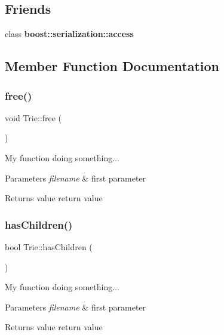 \subsection*{Friends}
\begin{DoxyCompactItemize}
\item 
\mbox{\label{classTrie_ac98d07dd8f7b70e16ccb9a01abf56b9c}} 
class {\bfseries boost\+::serialization\+::access}
\end{DoxyCompactItemize}


\subsection{Member Function Documentation}
\mbox{\label{classTrie_acc37b98a99d3262cf5d211070bca71d9}} 
\subsubsection{\texorpdfstring{free()}{free()}}
{\footnotesize\ttfamily void Trie\+::free (\begin{DoxyParamCaption}{ }\end{DoxyParamCaption})}

My function doing something... 
\begin{DoxyParams}{Parameters}
{\em filename} & first parameter \\
\hline
\end{DoxyParams}
\begin{DoxyReturn}{Returns}
value return value 
\end{DoxyReturn}
\mbox{\label{classTrie_ac3e8d2f809da499593ca4ff362fee58b}} 
\subsubsection{\texorpdfstring{has\+Children()}{hasChildren()}}
{\footnotesize\ttfamily bool Trie\+::has\+Children (\begin{DoxyParamCaption}{ }\end{DoxyParamCaption})}

My function doing something... 
\begin{DoxyParams}{Parameters}
{\em filename} & first parameter \\
\hline
\end{DoxyParams}
\begin{DoxyReturn}{Returns}
value return value 
\end{DoxyReturn}
\mbox{\label{classTrie_afc0913b4f93f5b86325147333f73029f}} 
